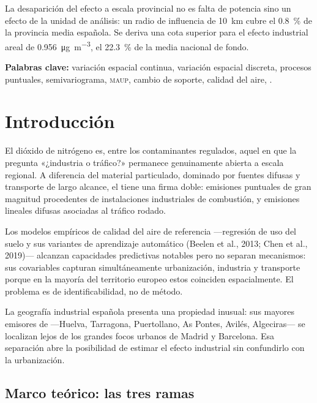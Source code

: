 \documentclass[11pt,a4paper]{article}
\begin{document}
La desaparición del efecto a escala provincial no es falta de potencia sino un
efecto de la unidad de análisis: un radio de influencia de \SI{10}{\kilo\metre}
cubre el \SI{0.8}{\percent} de la provincia media española. Se deriva una cota
superior para el efecto industrial areal de \SI{0.956}{\micro\gram\per\cubic\metre},
el \SI{22.3}{\percent} de la media nacional de fondo.

\vspace{4pt}
\noindent\textbf{Palabras clave:} variación espacial continua, variación
espacial discreta, procesos puntuales, semivariograma, \textsc{maup}, cambio de
soporte, calidad del aire, .

\section{Introducción}

El dióxido de nitrógeno es, entre los contaminantes regulados, aquel en que la
pregunta «¿industria o tráfico?» permanece genuinamente abierta a escala
regional. A diferencia del material particulado, dominado por fuentes difusas y
transporte de largo alcance, el  tiene una firma doble: emisiones
puntuales de gran magnitud procedentes de instalaciones industriales de
combustión, y emisiones lineales difusas asociadas al tráfico rodado.

Los modelos empíricos de calidad del aire de referencia —regresión de uso del
suelo y sus variantes de aprendizaje automático (Beelen et al., 2013; Chen et
al., 2019)— alcanzan capacidades predictivas notables pero no separan
mecanismos: sus covariables capturan simultáneamente urbanización, industria y
transporte porque en la mayoría del territorio europeo estos coinciden
espacialmente. El problema es de identificabilidad, no de método.

La geografía industrial española presenta una propiedad inusual: sus mayores
emisores de  —Huelva, Tarragona, Puertollano, As Pontes, Avilés,
Algeciras— se localizan lejos de los grandes focos urbanos de Madrid y
Barcelona. Esa separación abre la posibilidad de estimar el efecto industrial
sin confundirlo con la urbanización.

\subsection*{Marco teórico: las tres ramas}
\end{document}

